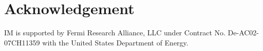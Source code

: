 \documentclass[usenatbib]{mn2e}
\begin{document}
\section{Acknowledgement}
IM is supported by Fermi Research Alliance, LLC under Contract No. De-AC02-07CH11359 with the United States Department of Energy.




\def\apj{ApJ}
\def\apjl{ApJL}
\def\aj{AJ}
\def\mnras{MNRAS}
\def\aap{A\&A}
\def\nat{nature}
\def\araa{ARAA}
\def\pasa{PASA}

\end{document}
